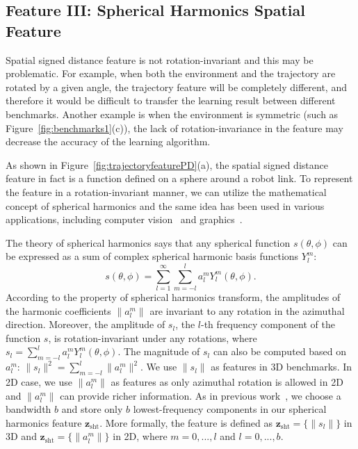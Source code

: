 \documentclass[letterpaper, 10 pt, conference]{ieeeconf}  %
\newcommand{\fsht}{\mbox{$\mathbf z_{\text{sht}}$}}
\begin{document}
\subsection{Feature III: Spherical Harmonics Spatial Feature}
Spatial signed distance feature is not rotation-invariant and this may be problematic.
For example, when both the environment and the trajectory are rotated by a given angle, the trajectory feature will be completely different, and therefore it would be difficult to transfer the learning result between different benchmarks. Another example is when the environment is symmetric (such as Figure~\ref{fig:benchmarks1}(c)), the lack of rotation-invariance in the feature may decrease the accuracy of the learning algorithm.

As shown in Figure~\ref{fig:trajectoryfeaturePD}(a), the spatial signed distance feature in fact is a function defined on a sphere around a robot link. To represent the feature in a rotation-invariant manner, we can utilize the mathematical concept of spherical harmonics and the same idea has been used in various applications, including computer vision~\cite{Frome:2004:ROR} and graphics~\cite{Kazhdan:2003:RIS}.


The theory of spherical harmonics says that any spherical function $s(\theta, \phi)$ can be expressed as a sum of complex spherical harmonic basis functions $Y_l^m$: 
\begin{equation}
s(\theta, \phi) = \sum_{l=1}^{\infty} \sum_{m=-l}^{l} a_l^m Y_l^m(\theta, \phi).
\end{equation}
According to the property of spherical harmonics transform, the amplitudes of the harmonic coefficients $\|a_l^m\|$ are invariant to any rotation in the azimuthal direction. Moreover, the amplitude of $s_l$, the $l$-th frequency component of the function $s$, is rotation-invariant under any rotations, where $s_l = \sum_{m=-l}^{l}a_l^m Y_l^m(\theta, \phi)$. The magnitude of $s_l$ can also be computed based on $a_l^m$: $\|s_l\|^2 = \sum_{m=-l}^l \|a_l^m\|^2$. We use $\|s_l\|$ as features in 3D benchmarks. In 2D case, we use $\|a_l^m\|$ as features as only azimuthal rotation is allowed in 2D and $\|a_l^m\|$ can provide richer information. As in previous work~\cite{Frome:2004:ROR,Kazhdan:2003:RIS}, we choose a bandwidth $b$ and store only $b$ lowest-frequency components in our spherical harmonics feature $\fsht$. More formally, the feature is defined as $\fsht = \{\|s_l\|\}$ in 3D and $\fsht = \{\|a_l^m\|\}$ in 2D, where $m = 0,...,l$ and $l = 0,...,b$.
\end{document}

